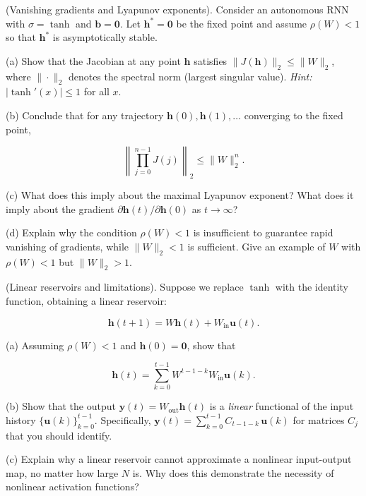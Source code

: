 \begin{exercise}
(Vanishing gradients and Lyapunov exponents). Consider an autonomous RNN with $\sigma = \tanh$ and $\mathbf{b} = \mathbf{0}$. Let $\mathbf{h}^* = \mathbf{0}$ be the fixed point and assume $\rho(W) < 1$ so that $\mathbf{h}^*$ is asymptotically stable.

(a) Show that the Jacobian at any point $\mathbf{h}$ satisfies $\|J(\mathbf{h})\|_2 \leq \|W\|_2$, where $\|\cdot\|_2$ denotes the spectral norm (largest singular value). \textit{Hint:} $|\tanh'(x)| \leq 1$ for all $x$.

(b) Conclude that for any trajectory $\mathbf{h}(0), \mathbf{h}(1), \ldots$ converging to the fixed point,

\[
\left\|\prod_{j=0}^{n-1} J(j)\right\|_2 \leq \|W\|_2^n.
\]

(c) What does this imply about the maximal Lyapunov exponent? What does it imply about the gradient $\partial \mathbf{h}(t)/\partial \mathbf{h}(0)$ as $t \to \infty$?

(d) Explain why the condition $\rho(W) < 1$ is insufficient to guarantee rapid vanishing of gradients, while $\|W\|_2 < 1$ is sufficient. Give an example of $W$ with $\rho(W) < 1$ but $\|W\|_2 > 1$.


\bigskip

\end{exercise}


\begin{exercise}
(Linear reservoirs and limitations). Suppose we replace $\tanh$ with the identity function, obtaining a linear reservoir:

\[
\mathbf{h}(t+1) = W\mathbf{h}(t) + W_{\text{in}}\mathbf{u}(t).
\]

(a) Assuming $\rho(W) < 1$ and $\mathbf{h}(0) = \mathbf{0}$, show that

\[
\mathbf{h}(t) = \sum_{k=0}^{t-1} W^{t-1-k} W_{\text{in}} \mathbf{u}(k).
\]

(b) Show that the output $\mathbf{y}(t) = W_{\text{out}} \mathbf{h}(t)$ is a \textit{linear} functional of the input history $\{\mathbf{u}(k)\}_{k=0}^{t-1}$. Specifically, $\mathbf{y}(t) = \sum_{k=0}^{t-1} C_{t-1-k} \,\mathbf{u}(k)$ for matrices $C_j$ that you should identify.

(c) Explain why a linear reservoir cannot approximate a nonlinear input-output map, no matter how large $N$ is. Why does this demonstrate the necessity of nonlinear activation functions?


\bigskip

\end{exercise}


